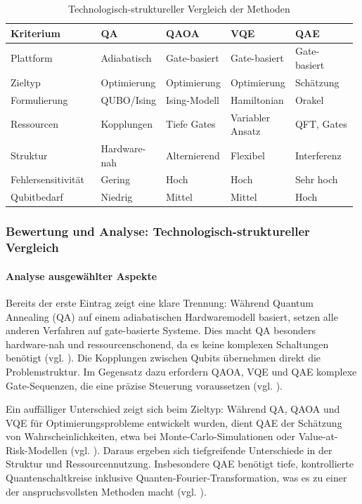 \begin{table}[H]
\centering
\caption{Technologisch-struktureller Vergleich der Methoden}
\renewcommand{\arraystretch}{1.2}
\begin{tabular}{|p{0.26\linewidth}|p{0.18\linewidth}|p{0.18\linewidth}|p{0.18\linewidth}|p{0.18\linewidth}|}
\hline
\textbf{Kriterium} & \textbf{QA} & \textbf{QAOA} & \textbf{VQE} & \textbf{QAE} \\
\hline
Plattform & Adiabatisch & Gate-basiert & Gate-basiert & Gate-basiert \\
\hline
Zieltyp & Optimierung & Optimierung & Optimierung & Schätzung \\
\hline
Formulierung & QUBO/Ising & Ising-Modell & Hamiltonian & Orakel \\
\hline
Ressourcen & Kopplungen & Tiefe Gates & Variabler Ansatz & QFT, Gates \\
\hline
Struktur & Hardware-nah & Alternierend & Flexibel & Interferenz \\
\hline
Fehlersensitivität & Gering & Hoch & Hoch & Sehr hoch \\
\hline
Qubitbedarf & Niedrig & Mittel & Mittel & Hoch \\
\hline
\end{tabular}
\end{table}

\subsubsection*{Bewertung und Analyse: Technologisch-struktureller Vergleich}

\paragraph{Analyse ausgewählter Aspekte}

Bereits der erste Eintrag zeigt eine klare Trennung: Während Quantum Annealing (QA) auf einem adiabatischen Hardwaremodell basiert, setzen alle anderen Verfahren auf gate-basierte Systeme. Dies macht QA besonders hardware-nah und ressourcenschonend, da es keine komplexen Schaltungen benötigt (vgl. \cite{orus_quantum_2019, mugel_dynamic_2022}). Die Kopplungen zwischen Qubits übernehmen direkt die Problemstruktur. Im Gegensatz dazu erfordern QAOA, VQE und QAE komplexe Gate-Sequenzen, die eine präzise Steuerung voraussetzen (vgl. \cite{buonaiuto_best_2023}).

Ein auffälliger Unterschied zeigt sich beim Zieltyp: Während QA, QAOA und VQE für Optimierungsprobleme entwickelt wurden, dient QAE der Schätzung von Wahrscheinlichkeiten, etwa bei Monte-Carlo-Simulationen oder Value-at-Risk-Modellen (vgl. \cite{rebentrost_quantum_2018, stamatopoulos_option_2020}). Daraus ergeben sich tiefgreifende Unterschiede in der Struktur und Ressourcennutzung. Insbesondere QAE benötigt tiefe, kontrollierte Quantenschaltkreise inklusive Quanten-Fourier-Transformation, was es zu einer der anspruchsvollsten Methoden macht (vgl. \cite{martin_new_2025}).

